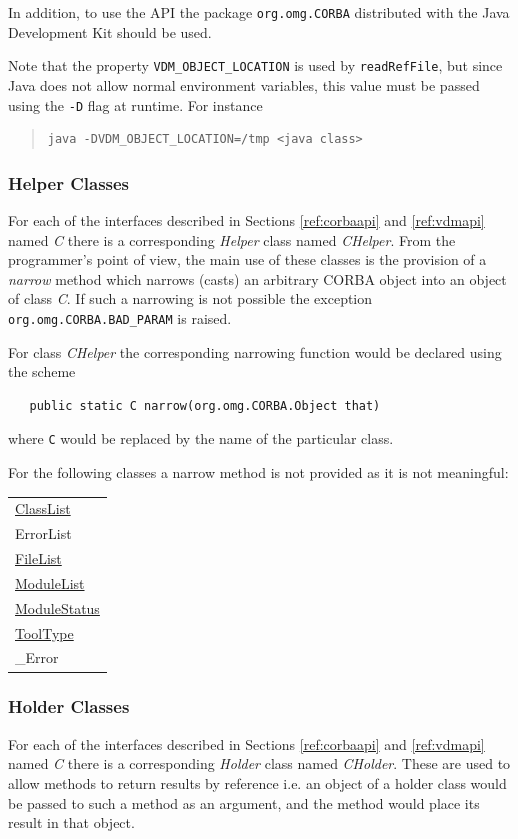 \documentclass[\pformat,12pt]{article}
\newcommand{\ModuleList}{\hyperlink{type.ModuleList}{ModuleList}}
\newcommand{\ClassList}{\hyperlink{type.ClassList}{ClassList}}
\newcommand{\FileList}{\hyperlink{type.FileList}{FileList}}
\newcommand{\ToolType}{\hyperlink{type.ToolType}{ToolType}}
\newcommand{\ModuleStatus}{\hyperlink{struct.ModuleStatus}{ModuleStatus}}
\begin{document}
In addition, to use the API the package \texttt{org.omg.CORBA}
distributed with the Java Development Kit should be used.

Note that the property \texttt{VDM\_OBJECT\_LOCATION} is
used by \texttt{readRefFile}, but since Java does not allow normal
environment variables, this value must be passed using the \texttt{-D}
flag at runtime. For instance 
\begin{quote}
\begin{verbatim}
java -DVDM_OBJECT_LOCATION=/tmp <java class>
\end{verbatim}
\end{quote}

\subsubsection{Helper Classes}
For each of the interfaces described in Sections
\ref{ref:corbaapi} and \ref{ref:vdmapi} named \textit{C} there is a
corresponding \textit{Helper} class named \textit{CHelper}. From the
programmer's point of view, the main use of these classes is the
provision of a \textit{narrow} method which narrows (casts) an arbitrary
CORBA object into an object of class \textit{C}. If such a narrowing
is not possible the exception \texttt{org.omg.CORBA.BAD\_PARAM} is
raised. 

For class \textit{CHelper} the corresponding narrowing function would
 be declared using the scheme
\begin{verbatim}
   public static C narrow(org.omg.CORBA.Object that)
\end{verbatim}
where \texttt{C} would be replaced by the name of the particular class.

For the following classes a narrow method is not provided as it is not
meaningful: 

\begin{tabular}{>{\ttfamily}l}
\ClassList \\
ErrorList \\
\FileList \\
\ModuleList \\
\ModuleStatus \\
\ToolType \\
\_Error \\
\end{tabular}




\subsubsection{Holder Classes}\label{ref:holder}
For each of the interfaces described in Sections
\ref{ref:corbaapi} and \ref{ref:vdmapi} named \textit{C} there is a
corresponding \textit{Holder} class named \textit{CHolder}. These are
used to allow methods to 
return results by reference i.e. an object of a holder class would be
passed to such a method as an argument, and the method would place its
result in that object.
\end{document}
